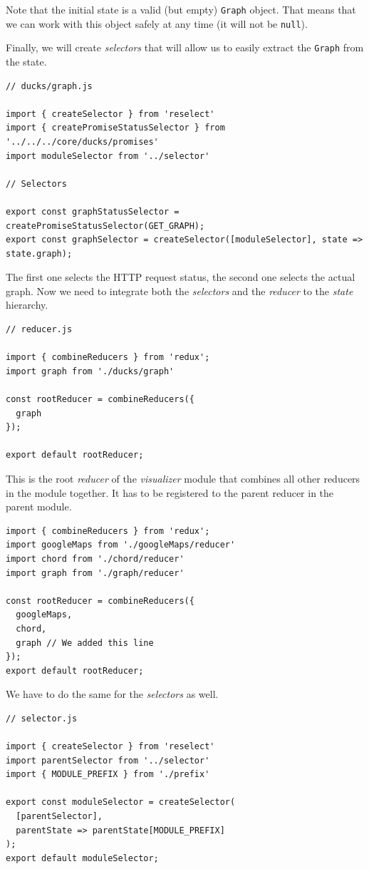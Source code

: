 Note that the initial state is a valid (but empty) \texttt{Graph} object. That means that we can work with this object safely at any time (it will not be \texttt{null}).

Finally, we will create \emph{selectors} that will allow us to easily extract the \texttt{Graph} from the state.

\begin{verbatim}
// ducks/graph.js

import { createSelector } from 'reselect'
import { createPromiseStatusSelector } from '../../../core/ducks/promises'
import moduleSelector from '../selector'

// Selectors

export const graphStatusSelector = createPromiseStatusSelector(GET_GRAPH);
export const graphSelector = createSelector([moduleSelector], state => state.graph);
\end{verbatim}

The first one selects the HTTP request status, the second one selects the actual graph. Now we need to integrate both the \emph{selectors} and the \emph{reducer} to the \emph{state} hierarchy.

\begin{verbatim}
// reducer.js

import { combineReducers } from 'redux';
import graph from './ducks/graph'

const rootReducer = combineReducers({
  graph
});

export default rootReducer;
\end{verbatim}

This is the root \emph{reducer} of the \emph{visualizer} module that combines all other reducers in the module together. It has to be registered to the parent reducer in the parent module.

\begin{verbatim}
import { combineReducers } from 'redux';
import googleMaps from './googleMaps/reducer'
import chord from './chord/reducer'
import graph from './graph/reducer'

const rootReducer = combineReducers({
  googleMaps,
  chord,
  graph // We added this line
});
export default rootReducer;
\end{verbatim}

We have to do the same for the \emph{selectors} as well.

\begin{verbatim}
// selector.js

import { createSelector } from 'reselect'
import parentSelector from '../selector'
import { MODULE_PREFIX } from './prefix'

export const moduleSelector = createSelector(
  [parentSelector],
  parentState => parentState[MODULE_PREFIX]
);
export default moduleSelector;
\end{verbatim}

